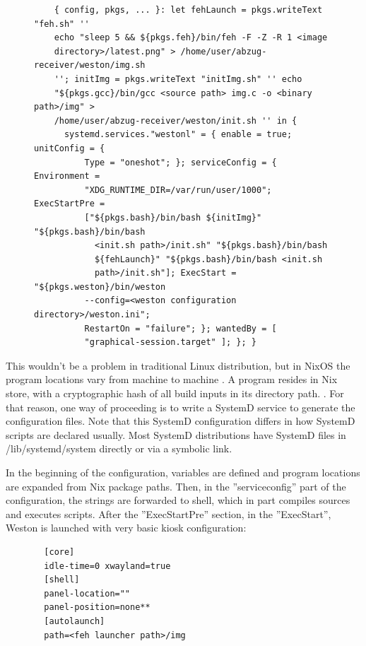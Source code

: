 \begin{figure}[H]
\begin{lstlisting} 
    { config, pkgs, ... }: let fehLaunch = pkgs.writeText "feh.sh" ''
    echo "sleep 5 && ${pkgs.feh}/bin/feh -F -Z -R 1 <image
    directory>/latest.png" > /home/user/abzug-receiver/weston/img.sh
    ''; initImg = pkgs.writeText "initImg.sh" '' echo
    "${pkgs.gcc}/bin/gcc <source path> img.c -o <binary path>/img" >
    /home/user/abzug-receiver/weston/init.sh '' in {
      systemd.services."westonl" = { enable = true; unitConfig = {
          Type = "oneshot"; }; serviceConfig = { Environment =
          "XDG_RUNTIME_DIR=/var/run/user/1000"; ExecStartPre =
          ["${pkgs.bash}/bin/bash ${initImg}" "${pkgs.bash}/bin/bash
            <init.sh path>/init.sh" "${pkgs.bash}/bin/bash
            ${fehLaunch}" "${pkgs.bash}/bin/bash <init.sh
            path>/init.sh"]; ExecStart = "${pkgs.weston}/bin/weston
          --config=<weston configuration directory>/weston.ini";
          RestartOn = "failure"; }; wantedBy = [
          "graphical-session.target" ]; }; }
\end{lstlisting}
\label{systemd1}
\end{figure}

This wouldn't be a problem in traditional Linux distribution, but in
NixOS the program locations vary from machine to machine
\cite{dolstra2010nixos}. A program resides in Nix store, with a
cryptographic hash of all build inputs in its directory
path. \cite{dolstra2010nixos}. For that reason, one way of proceeding
is to write a SystemD service to generate the configuration
files. Note that this SystemD configuration differs in how SystemD
scripts are declared usually. Most SystemD distributions have SystemD
files in /lib/systemd/system directly or via a symbolic link.

In the beginning of the configuration, variables are defined and
program locations are expanded from Nix package paths. Then, in the
''serviceconfig'' part of the configuration, the strings are forwarded
to shell, which in part compiles sources and executes scripts. After
the ''ExecStartPre'' section, in the ''ExecStart'', Weston is launched
with very basic kiosk configuration:

\begin{figure}
\begin{lstlisting} 
  [core]
  idle-time=0 xwayland=true
  [shell]
  panel-location=""
  panel-position=none**
  [autolaunch]
  path=<feh launcher path>/img
\end{lstlisting}
\label{westonconf}
\end{figure}

